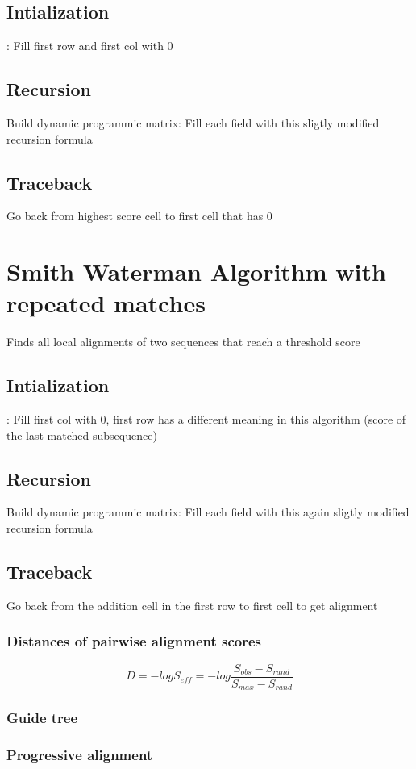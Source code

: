 \subsection{Intialization}:
Fill first row and first col with 0

\subsection{Recursion}
Build dynamic programmic matrix: Fill each field with this sligtly modified recursion formula

\subsection{Traceback}
Go back from highest score cell to first cell that has 0 



\section{Smith Waterman Algorithm with repeated matches}
Finds all local alignments of two sequences that reach a threshold score


\subsection{Intialization}:
Fill first col with 0, first row has a different meaning in this algorithm (score of the last matched subsequence)

\subsection{Recursion}
Build dynamic programmic matrix: Fill each field with this again sligtly modified recursion formula

\subsection{Traceback}
Go back from the addition cell in the first row to first cell to get alignment

\subsubsection{Distances of pairwise alignment scores}

\begin{equation}
	D = -log S_{eff} = -log \frac{S_{obs} - S_{rand}}{S_{max} - S_{rand}}
\end{equation}

\subsubsection{Guide tree}

\subsubsection{Progressive alignment}

